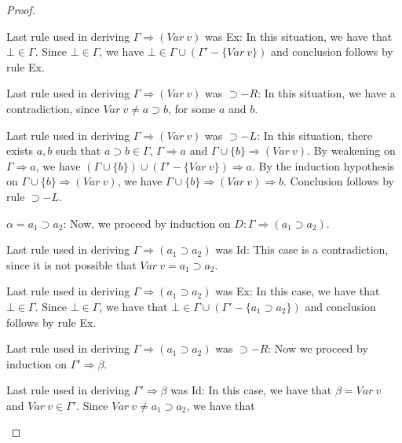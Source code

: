 \documentclass[12pt]{article}
\theoremstyle{definition}
\begin{document}
\begin{proof}
\begin{Cases}
\begin{Cases}
         \item Last rule used in deriving $\Gamma\Rightarrow (Var\:v)$ was Ex:
           In this situation, we have that $\bot \in \Gamma$. Since $\bot \in
           \Gamma$, we have $\bot \in \Gamma \cup (\Gamma' - \{Var\:v\})$ and
           conclusion follows by rule Ex.
         \item Last rule used in deriving $\Gamma\Rightarrow (Var\:v)$ was
           $\supset-R$: In this situation, we have a contradiction, since
           $Var\:v\neq a \supset b$, for some $a$ and $b$.
         \item Last rule used in deriving $\Gamma\Rightarrow (Var\:v)$ was
           $\supset-L$: In this situation, there exists $a, b$ such that
           $a \supset b \in \Gamma$, $\Gamma \Rightarrow a$ and
           $\Gamma \cup \{b\} \Rightarrow (Var\:v)$. By weakening on
           $\Gamma \Rightarrow a$, we have
           $(\Gamma \cup \{b\})\cup(\Gamma' - \{Var\:v\}) \Rightarrow a$.
           By the induction hypothesis on $\Gamma \cup \{b\} \Rightarrow
           (Var\:v)$, we have
           $\Gamma \cup \{b\} \Rightarrow (Var\:v) \Rightarrow b$.
           Conclusion follows by rule $\supset-L$.
      \end{Cases}
    \item $\alpha = a_1 \supset a_2$: Now, we proceed by induction on
      $D : \Gamma \Rightarrow (a_1 \supset a_2)$.
      \begin{Cases}
        \item Last rule used in deriving $\Gamma \Rightarrow (a_1 \supset a_2)$ was
          Id: This case is a contradiction, since it is not possible that
          $Var\:v = a_1\supset a_2$.
        \item Last rule used in deriving $\Gamma \Rightarrow (a_1 \supset a_2)$ was
          Ex: In this case, we have that $\bot \in \Gamma$. Since
          $\bot \in \Gamma$, we have that
          $\bot \in \Gamma \cup (\Gamma' - \{a_1 \supset a_2\})$ and conclusion
          follows by rule Ex.
        \item Last rule used in deriving $\Gamma \Rightarrow (a_1 \supset a_2)$ was
          $\supset-R$: Now we proceed by induction on $\Gamma' \Rightarrow
          \beta$.
          \begin{Cases}
             \item Last rule used in deriving $\Gamma' \Rightarrow \beta$ was Id:
               In this case, we have that $\beta = Var\:v$ and $Var\:v\in\Gamma'$.
               Since $Var\:v \neq a_1\supset a_2$, we have that

\end{Cases}
\end{Cases}
\end{Cases}
\end{proof}
\end{document}
